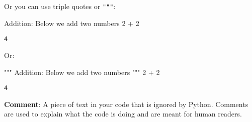 \documentclass[
  letterpaper,
  DIV=11,
  numbers=noendperiod]{scrreprt}
\newenvironment{Shaded}{\begin{snugshade}}{\end{snugshade}}
\newcommand{\CommentTok}[1]{\textcolor[rgb]{0.37,0.37,0.37}{#1}}
\newcommand{\DecValTok}[1]{\textcolor[rgb]{0.68,0.00,0.00}{#1}}
\newcommand{\OperatorTok}[1]{\textcolor[rgb]{0.37,0.37,0.37}{#1}}
\begin{document}
Or you can use triple quotes
\texttt{\textquotesingle{}\textquotesingle{}\textquotesingle{}} or
\texttt{"""}:

\begin{Shaded}
\begin{Highlighting}[]
\CommentTok{\textquotesingle{}\textquotesingle{}\textquotesingle{}}
\CommentTok{Addition:}
\CommentTok{Below we add two numbers}
\CommentTok{\textquotesingle{}\textquotesingle{}\textquotesingle{}}
\DecValTok{2} \OperatorTok{+} \DecValTok{2}
\end{Highlighting}
\end{Shaded}

\begin{verbatim}
4
\end{verbatim}

Or:

\begin{Shaded}
\begin{Highlighting}[]
\CommentTok{"""}
\CommentTok{Addition:}
\CommentTok{Below we add two numbers}
\CommentTok{"""}
\DecValTok{2} \OperatorTok{+} \DecValTok{2}
\end{Highlighting}
\end{Shaded}

\begin{verbatim}
4
\end{verbatim}

\begin{tcolorbox}[enhanced jigsaw, colframe=quarto-callout-note-color-frame, opacityback=0, titlerule=0mm, bottomrule=.15mm, breakable, leftrule=.75mm, colbacktitle=quarto-callout-note-color!10!white, title=\textcolor{quarto-callout-note-color}{\faInfo}\hspace{0.5em}{Vocab}, rightrule=.15mm, coltitle=black, opacitybacktitle=0.6, colback=white, left=2mm, arc=.35mm, toptitle=1mm, bottomtitle=1mm, toprule=.15mm]

\textbf{Comment}: A piece of text in your code that is ignored by
Python. Comments are used to explain what the code is doing and are
meant for human readers.

\end{tcolorbox}
\end{document}
